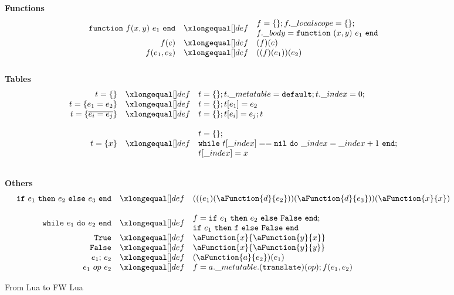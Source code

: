 \begin{figure}[P]
\caption{From Lua to FW Lua}
{\bf Functions}
\label{fig:Desugaring}
\[
\begin{array}{rclcl}
\desugar{
    {\tt function}~f(x,y)~e_1~{\tt end}
}{
    f = \{\}; f.\_localscope = \{\};\\
    f.\_body = {\tt function}~(x,y)~e_1~{\tt end}
}
\desugar{f(e)}{(f)(e)}
\desugar{f(e_1,e_2)}{((f)(e_1))(e_2)}
\\
\end{array}
\]
{\bf Tables}
\label{fig:tables}
\[
\begin{array}{rclcl}
\desugar{
    t = \{\}
}{
   t = \{\}; t.\_metatable = {\tt default}; t.\_index = 0;\\
}
\desugar{
    t = \{e_1=e_2\}
}{
   t = \{\}; t[e_1] = e_2
}
\desugar{
    t = \{\overline{e_i = e_j}\}
}{
  t = \{\}; t[e_i]=e_j; t 
}
\\
\desugar{
    t = \{x\}
}{
   t = \{\};\\
   {\tt while}~t[\_index] == {\tt nil~do} ~ \_index = \_index + 1~ {\tt end};\\
   t[\_index] = x
   
}

\\
\end{array}
\]

{\bf Others}\[
\begin{array}{rclcl}
\desugar{
    {\tt if}~e_1~{\tt then}~e_2~{\tt else}~e_3~{\tt end}
}{
    (((e_1)(\aFunction{d}{e_2}))(\aFunction{d}{e_3}))(\aFunction{x}{x})
}
\\
\desugar{
    {\tt while}~e_1~{\tt do}~e_2~{\tt end}
}{
    f =  {\tt if}~e_1~{\tt then}~e_2~{\tt else}~{\tt False}~{\tt end};\\
    {\tt if}~e_1~{\tt then}~{\tt f}~{\tt else}~{\tt False}~{\tt end}
}
\desugar{\tt True}{\aFunction{x}{\aFunction{y}{x}}}
\desugar{\tt False}{\aFunction{x}{\aFunction{y}{y}}}
\desugar{e_1{\tt ;}~e_2}{(\aFunction{a}{e_2})(e_1)}
\desugar{
    e_1~ op ~e_2
}{
    f = a.\_metatable.({\tt translate})(op); f(e_1, e_2)
    
}
\end{array}\]


\end{figure}
